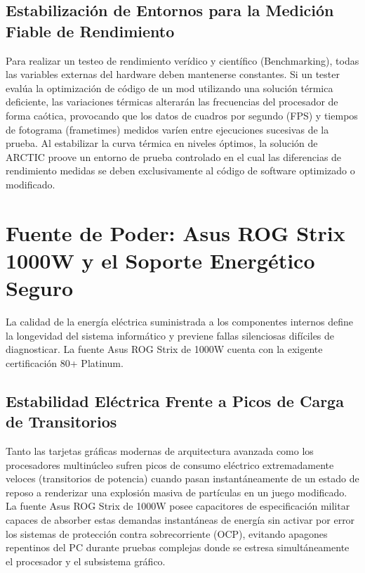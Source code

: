 \documentclass[12pt,a4paper]{article}
\begin{document}
\subsection{Estabilización de Entornos para la Medición Fiable de Rendimiento}
Para realizar un testeo de rendimiento verídico y científico (Benchmarking), todas las variables externas del hardware deben mantenerse constantes. Si un tester evalúa la optimización de código de un mod utilizando una solución térmica deficiente, las variaciones térmicas alterarán las frecuencias del procesador de forma caótica, provocando que los datos de cuadros por segundo (FPS) y tiempos de fotograma (frametimes) medidos varíen entre ejecuciones sucesivas de la prueba. Al estabilizar la curva térmica en niveles óptimos, la solución de ARCTIC proove un entorno de prueba controlado en el cual las diferencias de rendimiento medidas se deben exclusivamente al código de software optimizado o modificado.

\newpage

\section{Fuente de Poder: Asus ROG Strix 1000W y el Soporte Energético Seguro}

La calidad de la energía eléctrica suministrada a los componentes internos define la longevidad del sistema informático y previene fallas silenciosas difíciles de diagnosticar. La fuente Asus ROG Strix de 1000W cuenta con la exigente certificación 80+ Platinum.

\subsection{Estabilidad Eléctrica Frente a Picos de Carga de Transitorios}
Tanto las tarjetas gráficas modernas de arquitectura avanzada como los procesadores multinúcleo sufren picos de consumo eléctrico extremadamente veloces (transitorios de potencia) cuando pasan instantáneamente de un estado de reposo a renderizar una explosión masiva de partículas en un juego modificado. La fuente Asus ROG Strix de 1000W posee capacitores de especificación militar capaces de absorber estas demandas instantáneas de energía sin activar por error los sistemas de protección contra sobrecorriente (OCP), evitando apagones repentinos del PC durante pruebas complejas donde se estresa simultáneamente el procesador y el subsistema gráfico.
\end{document}
